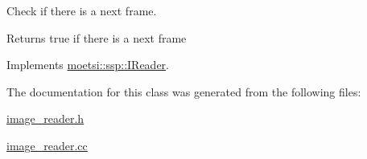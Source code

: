 Check if there is a next frame. 

\begin{DoxyReturn}{Returns}
true if there is a next frame 
\end{DoxyReturn}


Implements \hyperlink{classmoetsi_1_1ssp_1_1IReader_af9186ba41e136dc4ec3242b5dd55fa04}{moetsi\+::ssp\+::\+I\+Reader}.



The documentation for this class was generated from the following files\+:\begin{DoxyCompactItemize}
\item 
\hyperlink{image__reader_8h}{image\+\_\+reader.\+h}\item 
\hyperlink{image__reader_8cc}{image\+\_\+reader.\+cc}\end{DoxyCompactItemize}
